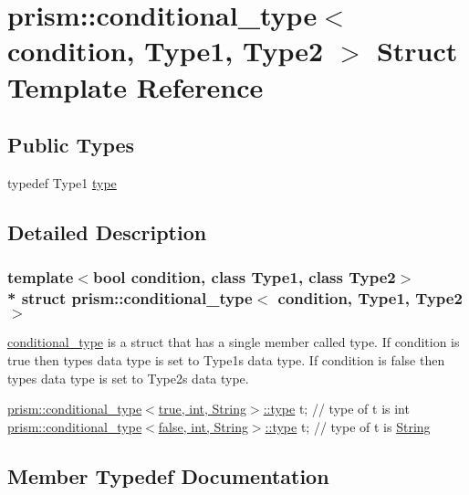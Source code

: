 \hypertarget{structprism_1_1conditional__type}{}\section{prism\+:\+:conditional\+\_\+type$<$ condition, Type1, Type2 $>$ Struct Template Reference}
\label{structprism_1_1conditional__type}
\subsection*{Public Types}
\begin{DoxyCompactItemize}
\item 
typedef Type1 \hyperlink{structprism_1_1conditional__type_a9d57ba7c29ee017e38e49bbb72229b7e}{type}
\end{DoxyCompactItemize}


\subsection{Detailed Description}
\subsubsection*{template$<$bool condition, class Type1, class Type2$>$\\*
struct prism\+::conditional\+\_\+type$<$ condition, Type1, Type2 $>$}

\hyperlink{structprism_1_1conditional__type}{conditional\+\_\+type} is a struct that has a single member called type. If condition is true then type\textquotesingle{}s data type is set to Type1\textquotesingle{}s data type. If condition is false then type\textquotesingle{}s data type is set to Type2\textquotesingle{}s data type.

\hyperlink{structprism_1_1conditional__type_a9d57ba7c29ee017e38e49bbb72229b7e}{prism\+::conditional\+\_\+type$<$true, int, String$>$\+::type} t; // type of t is int \hyperlink{structprism_1_1conditional__type_a9d57ba7c29ee017e38e49bbb72229b7e}{prism\+::conditional\+\_\+type$<$false, int, String$>$\+::type} t; // type of t is \hyperlink{classprism_1_1_string}{String} 

\subsection{Member Typedef Documentation}
